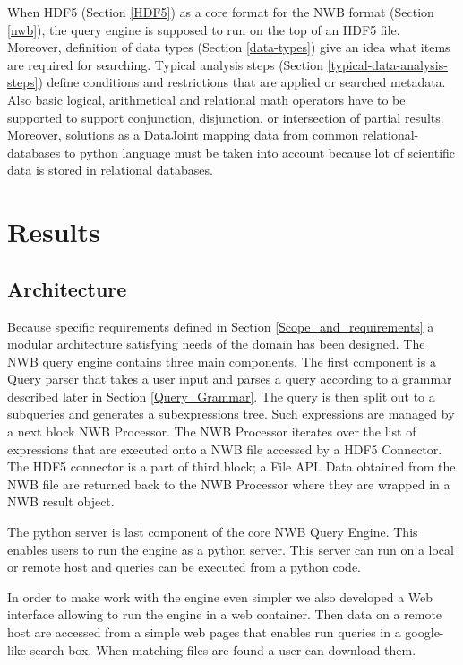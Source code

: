 \documentclass[utf8]{frontiersSCNS} %
\begin{document}
When HDF5 (Section \ref{HDF5}) as a core format for the NWB format (Section \ref{nwb}), the query engine is supposed to run on the top of an HDF5 file. Moreover, definition of data types (Section \ref{data-types}) give an idea what items are required for searching. Typical analysis steps (Section \ref{typical-data-analysis-steps}) define conditions and restrictions that are applied or searched metadata. Also basic logical, arithmetical and relational math operators have to be supported to support conjunction, disjunction, or intersection of partial results. Moreover, solutions as a DataJoint mapping data from common relational-databases to python language must be taken into account because lot of scientific data is stored in relational databases.

\section{Results}
\label{results}


\subsection{Architecture}
\label{Architecture}

Because specific requirements defined in Section \ref{Scope_and_requirements} a modular architecture satisfying needs of the domain has been designed. The NWB query engine contains three main components. The first component is a Query parser that takes a user input and parses a query according to a grammar described later in Section \ref{Query_Grammar}. The query is then split out to a subqueries and generates a subexpressions tree. Such expressions are managed by a next block NWB Processor. The NWB Processor iterates over the list of expressions that are executed onto a NWB file accessed by a HDF5 Connector. The HDF5 connector is a part of third block; a File API. Data obtained from the NWB file are returned back to the NWB Processor where they are wrapped in a NWB result object. 

The python server is last component of the core NWB Query Engine. This enables users to run the engine as a python server. This server can run on a local or remote host and queries can be executed from a python code.

In order to make work with the engine even simpler we also developed a Web interface allowing to run the engine in a web container. Then data on a remote host are accessed from a simple web pages that enables run queries in a google-like search box. When matching files are found a user can download them.
\end{document}

